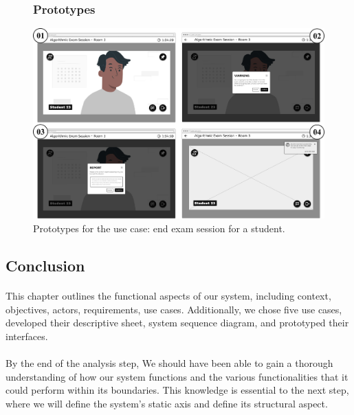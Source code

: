 \documentclass[]{uc2pfecaneva}
\begin{document}
    \begin{figure}[h]
        \subsubsection{Prototypes}
        \includegraphics[width=\textwidth]{images/prototypes_end_exam_session}
        \caption{Prototypes for the use case: end exam session for a student.}
    \end{figure}
    \clearpage
    \raggedright\subsection{Conclusion}
    \justifying\paragraph{}
    This chapter outlines the functional aspects of our system, including context, objectives, actors, requirements, use cases. Additionally, we chose five use cases, developed their descriptive sheet, system sequence diagram, and prototyped their interfaces.
    \justifying\paragraph{}
    By the end of the analysis step, We should have been able to gain a thorough understanding of how our system functions and the various functionalities that it could perform within its boundaries. This knowledge is essential to the next step, where we will define the system's static axis and define its structural aspect.
\end{document}
